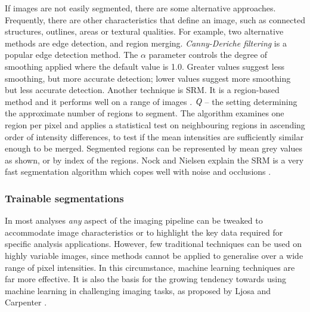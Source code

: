 If images are not easily segmented, there are some alternative approaches. Frequently, there are other characteristics that define an image, such as connected structures, outlines, areas or textural qualities. For example, two alternative methods are edge detection, and region merging. \emph{Canny-Deriche filtering} \cite{Deriche1987} is a popular edge detection method. The $\alpha$ parameter controls the degree of smoothing applied where the default value is 1.0. Greater values suggest less smoothing, but more accurate detection; lower values suggest more smoothing but less accurate detection. Another technique is \ac{SRM}. It is a region-based method and it performs well on a range of images \cite{Nock2004, Nock2005}. $\emph{Q}$ -- the setting determining the approximate number of regions to segment. The algorithm examines one region per pixel and applies a statistical test on neighbouring regions in ascending order of intensity differences, to test if the mean intensities are sufficiently similar enough to be merged. Segmented regions can be represented by mean grey values as shown, or by index of the regions. Nock and Nielsen \cite{Nock2004, Nock2005} explain the \ac{SRM} is a very fast segmentation algorithm which copes well with noise and occlusions \cite[pg.1458]{Nock2004}. 

\subsubsection{Trainable segmentations}\label{sec:trainable-segmentations}
In most analyses \emph{any} aspect of the imaging pipeline can be tweaked to accommodate image characteristics or to highlight the key data required for specific analysis applications. However, few traditional techniques can be used on highly variable images, since methods cannot be applied to generalise over a wide range of pixel intensities. In this circumstance, machine learning techniques are far more effective. It is also the basis for the growing tendency towards using machine learning in challenging imaging tasks, as proposed by Ljosa and Carpenter \cite{Ljosa2009}.

